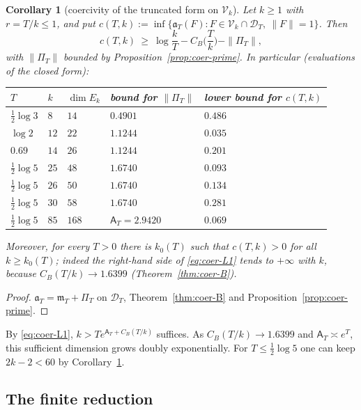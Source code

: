 \documentclass[10pt]{amsart}
\newtheorem{corollary}[theorem]{Corollary}
\theoremstyle{definition}
\theoremstyle{remark}
\newcommand{\Aconst}{\mathsf A_T}
\newcommand{\PiT}{\Pi_T}
\newcommand{\mT}{\mathfrak m_T}
\begin{document}
\begin{corollary}[coercivity of the truncated form on $\mathcal V_k$]\label{cor:coer-L1}
Let $k\ge1$ with $r=T/k\le1$, and put $c(T,k):=\inf\{\mathfrak a_T(F):F\in\mathcal V_k\cap\mathcal D_T,\ \|F\|=1\}$. Then
\begin{equation}\label{eq:coer-L1}
c(T,k)\ \ge\ \log\frac kT-C_B\Big(\frac Tk\Big)-\|\PiT\| ,
\end{equation}
with $\|\PiT\|$ bounded by Proposition~\ref{prop:coer-prime}. In particular (evaluations of the closed form):
\begin{center}
\begin{tabular}{@{}lllll@{}}
\toprule
$T$ & $k$ & $\dim E_k$ & bound for $\|\PiT\|$ & lower bound for $c(T,k)$\\
\midrule
$\frac12\log3$ & $8$ & $14$ & $0.4901$ & $0.486$\\
$\log2$ & $12$ & $22$ & $1.1244$ & $0.035$\\
$0.69$ & $14$ & $26$ & $1.1244$ & $0.201$\\
$\frac12\log5$ & $25$ & $48$ & $1.6740$ & $0.093$\\
$\frac12\log5$ & $26$ & $50$ & $1.6740$ & $0.134$\\
$\frac12\log5$ & $30$ & $58$ & $1.6740$ & $0.281$\\
$\frac12\log5$ & $85$ & $168$ & $\Aconst=2.9420$ & $0.069$\\
\bottomrule
\end{tabular}
\end{center}
Moreover, for every $T>0$ there is $k_0(T)$ such that $c(T,k)>0$ for all $k\ge k_0(T)$; indeed the right-hand side
of \eqref{eq:coer-L1} tends to $+\infty$ with $k$, because $C_B(T/k)\to1.6399$ (Theorem~\ref{thm:coer-B}).
\end{corollary}
\begin{proof}
$\mathfrak a_T=\mT+\PiT$ on $\mathcal D_T$, Theorem~\ref{thm:coer-B} and Proposition~\ref{prop:coer-prime}.
\end{proof}

By \eqref{eq:coer-L1}, $k>Te^{\Aconst+C_B(T/k)}$ suffices.
As $C_B(T/k)\to1.6399$ and $\Aconst\asymp e^T$, this sufficient dimension
grows doubly exponentially. For $T\le\tfrac12\log5$ one can keep $2k-2<60$
by Corollary~\ref{cor:coer-L1}.




\subsection{The finite reduction}\label{subsec:coer-schur}
\end{document}
